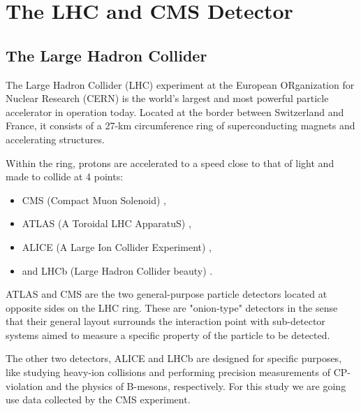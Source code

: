 %
%
%
%

\chapter{The LHC and CMS Detector}
\section{The Large Hadron Collider}

The Large Hadron Collider (LHC) \cite{Breskin:1244506} experiment at the European ORganization for Nuclear Research (CERN) is the world's largest and most powerful particle accelerator in operation today. Located at the border between Switzerland and France, it consists of a 27-km circumference ring of superconducting magnets and accelerating structures.

Within the ring, protons are accelerated to a speed close to that of light and made to collide at 4 points:

\begin{itemize}
\item CMS (Compact Muon Solenoid) \cite{Chatrchyan:2008aa},
\item ATLAS (A Toroidal LHC ApparatuS) \cite{1748-0221-3-08-S08003},
\item ALICE (A Large Ion Collider Experiment) \cite{Aamodt:2008zz},
\item and LHCb (Large Hadron Collider beauty) \cite{Alves:2008zz}.
\end{itemize}

ATLAS and CMS are the two general-purpose particle detectors located at opposite sides on the LHC ring. These are "onion-type" detectors in the sense that their general layout surrounds the interaction point with sub-detector systems aimed to measure a specific property of the particle to be detected.

The other two detectors, ALICE and LHCb are designed for specific purposes, like studying heavy-ion collisions and performing precision measurements of CP-violation and the physics of B-mesons, respectively. For this study we are going use data collected by the CMS experiment.

